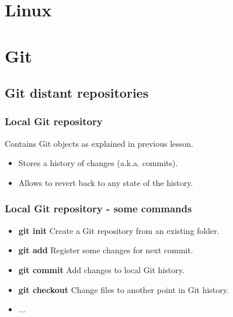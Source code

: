 



\begin{frame}
   \titlepage
\end{frame}

\begin{frame}
   \tableofcontents
\end{frame}

\section{Linux}
\section{Git}

\subsection{Git distant repositories}


\begin{frame}
\frametitle{Local Git repository}
   Contains Git objects as explained in previous lesson.
   \begin{itemize}
      \item Stores a history of changes (a.k.a. commits).
      \item Allows to revert back to any state of the history.
   \end{itemize}
\end{frame}

\begin{frame}
\frametitle{Local Git repository - some commands}
   \begin{itemize}
      \item {\bf git init} Create a Git repository from an existing folder.
      \item {\bf git add} Register some changes for next commit.
      \item {\bf git commit} Add changes to local Git history.
      \item {\bf git checkout} Change files to another point in Git history.
      \item ...
   \end{itemize}
\end{frame}

